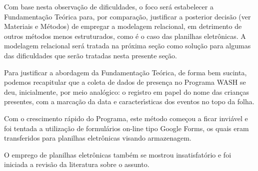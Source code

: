 \documentclass[
12pt,		%
openright,	%
twoside,  %
a4paper,			%
chapter=TITLE,		%
english,			%
french,				%
spanish,			%
brazil				%
]{USPSC-classe/USPSC}
\begin{document}
Com base nesta observa\c{c}\~ao de dificuldades, o foco  ser\'a estabelecer a Fundamenta\c{c}\~ao Te\'orica para, por compara\c{c}\~ao, justificar a posterior decis\~ao (ver Materiais e M\'etodos) de empregar a modelagem relacional, em detrimento de outros m\'etodos menos estruturados, como \'e o caso das planilhas eletr\^onicas. A modelagem relacional ser\'a tratada na pr\'oxima se\c{c}\~ao como solu\c{c}\~ao para algumas das dificuldades que ser\~ao tratadas nesta presente se\c{c}\~ao.

















Para justificar a abordagem da Fundamenta\c{c}\~ao Te\'orica, de forma bem sucinta, podemos recapitular que a coleta de dados de presen\c{c}a no  Programa WASH se deu, inicialmente, por meio anal\'ogico: o registro em papel do nome das crian\c{c}as presentes, com a marca\c{c}\~ao da data e caracter\'{\i}sticas dos eventos no topo da folha.

















Com o crescimento r\'apido do Programa, este m\'etodo come\c{c}ou a ficar invi\'avel e foi tentada a utiliza\c{c}\~ao de formul\'arios on-line tipo \textquotedbl Google Forms\textquotedbl , os quais eram transferidos para planilhas eletr\^onicas visando armazenagem.

















O emprego de planilhas eletr\^onicas tamb\'em se mostrou insatisfat\'orio e foi iniciada a revis\~ao da literatura sobre o assunto.
\end{document}
